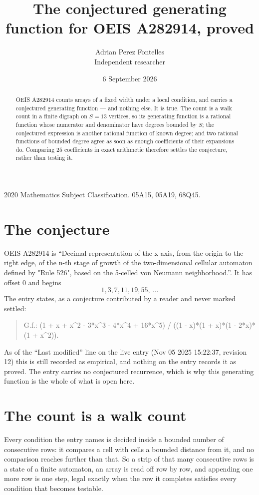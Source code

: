 \documentclass[11pt,a4paper]{article}
\title{The conjectured generating function for OEIS A282914, proved}
\author{Adrian Perez Fontelles\\ \small Independent researcher}
\date{6 September 2026}
\theoremstyle{plain}
\theoremstyle{definition}
\begin{document}
\maketitle

\begin{abstract}
OEIS A282914 counts arrays of a fixed width under a local condition, and carries a conjectured
generating function --- and nothing else. It is true. The count is a walk count in a finite
digraph on $S=13$ vertices, so its generating function is a rational function whose numerator
and denominator have degrees bounded by $S$; the conjectured expression is another rational
function of known degree; and two rational functions of bounded degree agree as soon as enough
coefficients of their expansions do. Comparing $25$ coefficients in exact arithmetic
therefore settles the conjecture, rather than testing it.
\end{abstract}

\noindent\small 2020 Mathematics Subject Classification. 05A15, 05A19, 68Q45.\normalsize

\section{The conjecture}

OEIS A282914 is ``Decimal representation of the x-axis, from the origin to the right edge, of the n-th stage of growth of the two-dimensional cellular automaton defined by "Rule 526", based on the 5-celled von Neumann neighborhood.''. It has offset $0$ and begins
\[
1, 3, 7, 11, 19, 55,\ \dots
\]
The entry states, as a conjecture contributed by a reader and never marked settled:
\begin{quote}
G.f.: (1 + x + x\^{}2 - 3*x\^{}3 - 4*x\^{}4 + 16*x\^{}5) / ((1 - x)*(1 + x)*(1 - 2*x)*(1 + x\^{}2)).
\end{quote}
As of the ``Last modified'' line on the live entry (Nov 05 2025 15:22:37, revision 12) this is still
recorded as empirical, and nothing on the entry records it as proved. The entry carries no
conjectured recurrence, which is why this generating function is the whole of what is open
here.

\section{The count is a walk count}

Every condition the entry names is decided inside a bounded number of consecutive rows: it
compares a cell with cells a bounded distance from it, and no comparison reaches further than
that. So a strip of that many consecutive rows is a state of a finite automaton, an array is
read off row by row, and appending one more row is one step, legal exactly when the row it
completes satisfies every condition that becomes testable.
\end{document}
